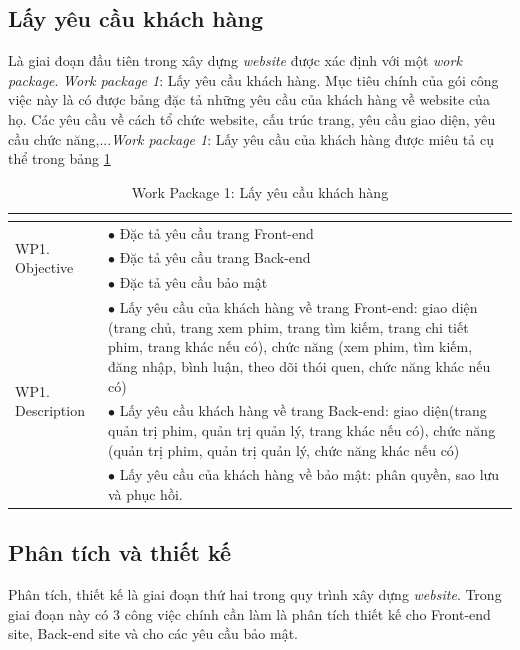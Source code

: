 \documentclass[a4paper]{book}
\begin{document}
\subsection{Lấy yêu cầu khách hàng}
Là giai đoạn đầu tiên trong xây dựng \textit{website} được xác định với một \textit{work package}. \textit{Work package 1}: Lấy yêu cầu khách hàng. Mục tiêu chính của gói công việc này là có được bảng đặc tả những yêu cầu của khách hàng về website của họ. Các yêu cầu về cách tổ chức website, cấu trúc trang, yêu cầu giao diện, yêu cầu chức năng,...\textit{Work package 1}: Lấy yêu cầu của khách hàng được miêu tả cụ thể trong bảng \ref{table:lay_yeu_cau}
\begin{table}[h!]
	\begin{center}
		\begin{tabular}{|p{4cm}|p{10cm}|}
			\hline
			\multicolumn{2}{|c|}{\cellcolor[HTML]{363636}{\color[HTML]{FFFFFF}Work package 1: Lấy yêu cầu khách hàng}}\\
			\hline
			\multirow{3}{*}{WP1. Objective} & $\bullet$ Đặc tả yêu cầu trang Front-end\\
			 & $\bullet$ Đặc tả yêu cầu trang Back-end \\
			 & $\bullet$ Đặc tả yêu cầu bảo mật	\\
			\hline
			\multirow{3}{*}{WP1. Description} & $\bullet$ Lấy yêu cầu của khách hàng về trang Front-end: giao diện (trang chủ, trang xem phim, trang tìm kiếm, trang chi tiết phim, trang khác nếu có), chức năng (xem phim, tìm kiếm, đăng nhập, bình luận, theo dõi thói quen, chức năng khác nếu có) \\
			& $\bullet$ Lấy yêu cầu khách hàng về trang Back-end: giao diện(trang quản trị phim, quản trị quản lý, trang khác nếu có), chức năng (quản trị phim, quản trị quản lý, chức năng khác nếu có)\\
			& $\bullet$ Lấy yêu cầu của khách hàng về bảo mật: phân quyền, sao lưu và phục hồi.\\
			\hline
		\end{tabular}
	\caption{Work Package 1: Lấy yêu cầu khách hàng}
	\label{table:lay_yeu_cau}
	\end{center}
\end{table}
\subsection{Phân tích và thiết kế}
Phân tích, thiết kế là giai đoạn thứ hai trong quy trình xây dựng \textit{website}. Trong giai đoạn này có 3 công việc chính cần làm là phân tích thiết kế cho Front-end site, Back-end site và cho các yêu cầu bảo mật.
\end{document}
